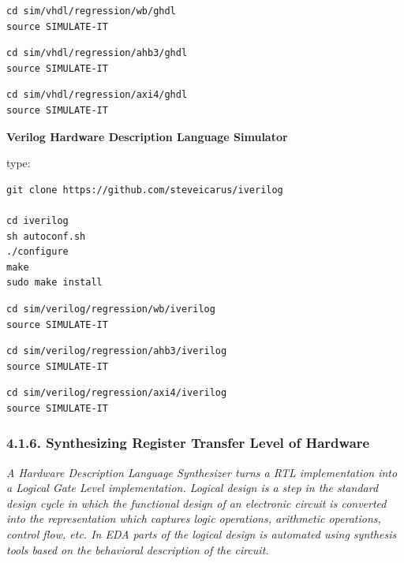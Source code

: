 \documentclass[
]{article}
\begin{document}
\begin{verbatim}
cd sim/vhdl/regression/wb/ghdl
source SIMULATE-IT
\end{verbatim}

\begin{verbatim}
cd sim/vhdl/regression/ahb3/ghdl
source SIMULATE-IT
\end{verbatim}

\begin{verbatim}
cd sim/vhdl/regression/axi4/ghdl
source SIMULATE-IT
\end{verbatim}

\textbf{Verilog Hardware Description Language Simulator}

type:

\begin{verbatim}
git clone https://github.com/steveicarus/iverilog

cd iverilog
sh autoconf.sh
./configure
make
sudo make install
\end{verbatim}

\begin{verbatim}
cd sim/verilog/regression/wb/iverilog
source SIMULATE-IT
\end{verbatim}

\begin{verbatim}
cd sim/verilog/regression/ahb3/iverilog
source SIMULATE-IT
\end{verbatim}

\begin{verbatim}
cd sim/verilog/regression/axi4/iverilog
source SIMULATE-IT
\end{verbatim}

\hypertarget{synthesizing-register-transfer-level-of-hardware-1}{%
\subsubsection{4.1.6. Synthesizing Register Transfer Level of
Hardware}\label{synthesizing-register-transfer-level-of-hardware-1}}

\emph{A Hardware Description Language Synthesizer turns a RTL
implementation into a Logical Gate Level implementation. Logical design
is a step in the standard design cycle in which the functional design of
an electronic circuit is converted into the representation which
captures logic operations, arithmetic operations, control flow, etc. In
EDA parts of the logical design is automated using synthesis tools based
on the behavioral description of the circuit.}
\end{document}
